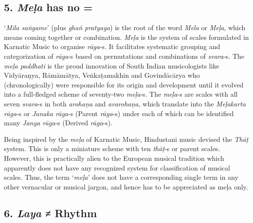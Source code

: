 \subsection*{5. \textit{Meḷa} has no =}

`\textit{Mila saṅgame}’ (plus \textit{ghañ pratyaya}) is the root of the word \textit{Mela} or \textit{Meḷa}, which means coming together or combination. \textit{Meḷa} is the system of scales formulated in Karnatic Music to organise \textit{rāga}-s. It facilitates systematic grouping and categorization of \textit{rāga}-s based on permutations and combinations of \textit{svara}-s. The \textit{meḷa paddhati} is the proud innovation of South Indian musicologists like Vidyāraṇya, Rāmāmātya, Veṅkaṭamakhin and Govindācārya who (chronologically) were responsible for its origin and development until it evolved into a full-fledged scheme of seventy-two \textit{meḷa}-s. The \textit{meḷa}-s are scales with all seven \textit{svara}-s in both \textit{arohaṇa} and \textit{avarohaṇa}, which translate into the \textit{Meḷakarta rāga}-s or \textit{Janaka rāga}-s (Parent \textit{rāga}-s) under each of which can be identified many \textit{Janya rāga}-s (Derived \textit{rāga}-s).

Being inspired by the \textit{meḷa} of Karnatic Music, Hindustani music devised the \textit{Thāṭ} system. This is only a miniature scheme with ten \textit{thāṭ}-s or parent scales. However, this is practically alien to the European musical tradition which apparently does not have any recognized system for classification of musical scales. Thus, the term ‘\textit{meḷa}’ does not have a corresponding single term in any other vernacular or musical jargon, and hence has to be appreciated as meḷa only.


\subsection*{6. \textit{Laya} ≠ Rhythm}

